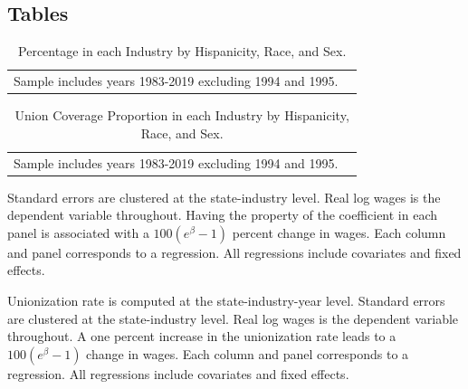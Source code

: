 \documentclass[11pt]{article}
\begin{document}
{\pagebreak
\begin{landscape}
\section*{Tables}
\small{}
\end{landscape}

\pagebreak
\begin{landscape}
\small{\begin{table}[h!]
    \centering
    \caption{Percentage in each Industry by Hispanicity, Race, and Sex.}\label{tab:nindtab}
    \fontsize{10}{11}\selectfont
\begin{tabular}{l*{8}{c}}

\hline\hline
\multicolumn{8}{l}{\footnotesize Sample includes years 1983-2019 excluding 1994 and 1995.}\\
\end{tabular}
\end{table}}

\small{\begin{table}[h!]
    \centering
    \caption{Union Coverage Proportion in each Industry by Hispanicity, Race, and Sex.}\label{tab:unindtab}
    \fontsize{10}{11}\selectfont
\begin{tabular}{l*{8}{c}}

\hline\hline
\multicolumn{8}{l}{\footnotesize Sample includes years 1983-2019 excluding 1994 and 1995.}\\
\end{tabular}
\end{table}}
\end{landscape}

\pagebreak
\small{}
\footnotesize{Standard errors are clustered at the state-industry level. Real log wages is the dependent variable throughout. Having the property of the coefficient in each panel is associated with a $ 100(e^\beta - 1) $ percent change in wages. Each column and panel corresponds to a regression. All regressions include covariates and fixed effects.}

\pagebreak
\small{}
\footnotesize{Unionization rate is computed at the state-industry-year level. Standard errors are clustered at the state-industry level. Real log wages is the dependent variable throughout. A one percent increase in the unionization rate leads to a $100(e^{\beta} - 1)$ change in wages. Each column and panel corresponds to a regression. All regressions include covariates and fixed effects.}

}
\end{document}

